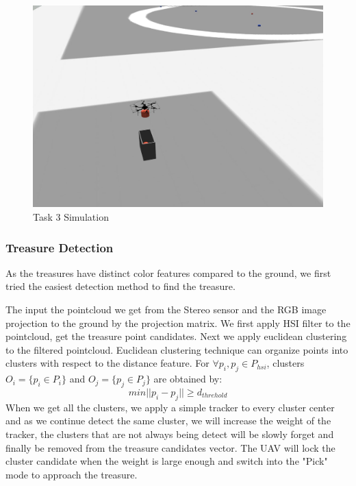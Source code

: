 \documentclass{standalone}
\begin{document}
    
  \begin{figure}[b]
    \begin{center}
      \includegraphics[keepaspectratio=true, width=1\linewidth, height=0.20\textheight]{img//t3simu.jpg}
    \end{center}
    \caption{Task 3 Simulation}
    \label{t3state}
  \end{figure}


\subsubsection{Treasure Detection}
As the treasures have distinct color features compared to the ground, we first tried the easiest detection method to find the treasure. 

The input the pointcloud we get from the Stereo sensor and the RGB image projection to the ground by the projection matrix. We first apply HSI filter to the pointcloud, get the treasure point candidates. Next we apply euclidean clustering to the filtered pointcloud. Euclidean clustering technique can organize points into clusters with respect to the distance feature. For $\forall p_i, p_j \in P_{hsi}$, clusters $O_i = \{p_i \in P_i\}$ and $O_j = \{p_j \in P_j\}$ are obtained by:
\begin{equation}\label{eq3-1}
min||p_i - p_j|| \geq d_{threhold} 
\end{equation}
When we get all the clusters, we apply a simple tracker to every cluster center and as we continue detect the same cluster, we will increase the weight of the tracker, the clusters that are not always being detect will be slowly forget and finally be removed from the treasure candidates vector. The UAV will lock the cluster candidate when the weight is large enough and switch into the "Pick" mode to approach the treasure.
\end{document}
